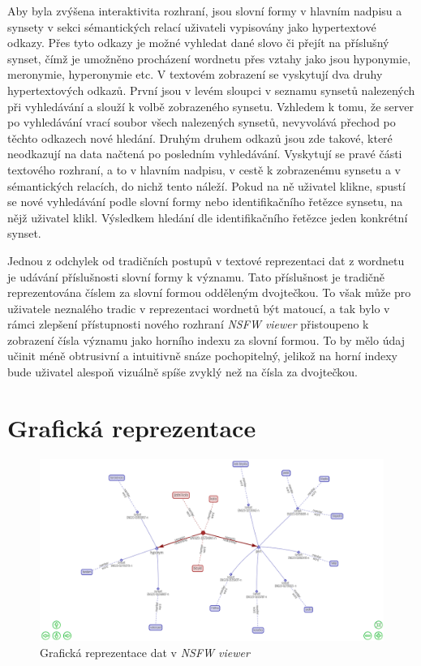 \documentclass[a4paper, 11pt, oneside]{book}
\newcommand{\simplywn}{\textit{NSFW viewer} }
\begin{document}
				Aby byla zvýšena interaktivita rozhraní, jsou slovní formy v hlavním nadpisu a synsety v sekci sémantických relací uživateli vypisovány jako hypertextové odkazy. Přes tyto odkazy je možné vyhledat dané slovo či přejít na příslušný synset, čímž je umožněno procházení wordnetu přes vztahy jako jsou hyponymie, meronymie, hyperonymie etc. V textovém zobrazení se vyskytují dva druhy hypertextových odkazů. První jsou v levém sloupci v seznamu synsetů nalezených při vyhledávání a slouží k volbě zobrazeného synsetu. Vzhledem k tomu, že server po vyhledávání vrací soubor všech nalezených synsetů, nevyvolává přechod po těchto odkazech nové hledání. Druhým druhem odkazů jsou zde takové, které neodkazují na data načtená po posledním vyhledávání. Vyskytují se pravé části textového rozhraní, a to v hlavním nadpisu, v cestě k zobrazenému synsetu a v sémantických relacích, do nichž tento náleží. Pokud na ně uživatel klikne, spustí se nové vyhledávání podle slovní formy nebo identifikačního řetězce synsetu, na nějž uživatel klikl. Výsledkem hledání dle identifikačního řetězce jeden konkrétní synset.

				Jednou z odchylek od tradičních postupů v textové reprezentaci dat z wordnetu je udávání příslušnosti slovní formy k významu. Tato příslušnost je tradičně reprezentována číslem za slovní formou odděleným dvojtečkou. To však může pro uživatele neznalého tradic v reprezentaci wordnetů být matoucí, a tak bylo v rámci zlepšení přístupnosti nového rozhraní \simplywn přistoupeno k zobrazení čísla významu jako horního indexu za slovní formou. To by mělo údaj učinit méně obtrusivní a intuitivně snáze pochopitelný, jelikož na horní indexy bude uživatel alespoň vizuálně spíše zvyklý než na čísla za dvojtečkou.

			\section{Grafická reprezentace}

				\begin{figure}[h]
					\centering
					\includegraphics[width=1.0\textwidth]{simplywn_graph.png}
					\caption{Grafická reprezentace dat v \simplywn}
					\label{fig:simplywn_graph}
				\end{figure}
\end{document}
